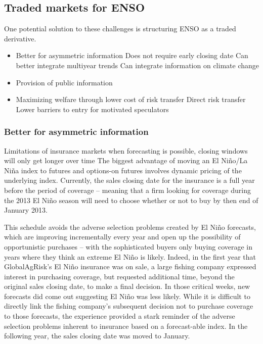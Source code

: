 \documentclass[authoryear]{article}
\begin{document}
\subsection{Traded markets for ENSO}
One potential solution to these challenges is structuring ENSO as a traded derivative.


\begin{itemize}
\item Better for asymmetric information
  \subitem Does not require early closing date
  \subitem Can better integrate multiyear trends
  \subitem Can integrate information on climate change
\item Provision of public information
\item Maximizing welfare through lower cost of risk transfer
  \subitem Direct risk transfer
  \subitem Lower barriers to entry for motivated speculators
\end{itemize}

\subsubsection{Better for asymmetric information} Limitations of insurance markets when forecasting is possible, closing windows will only get longer over time
The biggest advantage of moving an El Ni\~no/La Ni\~na index to futures and options-on futures involves dynamic pricing of the underlying index. Currently, the sales closing date for the insurance is a full year before the period of coverage – meaning that a firm looking for coverage during the 2013 El Ni\~no season will need to choose whether or not to buy by then end of January 2013. 

This schedule avoids the adverse selection problems created by El Ni\~no forecasts, which are improving incrementally every year and open up the possibility of opportunistic purchases – with the sophisticated buyers only buying coverage in years where they think an extreme El Ni\~no is likely. Indeed, in the first year that GlobalAgRisk’s El Ni\~no insurance was on sale, a large fishing company expressed interest in purchasing coverage, but requested additional time, beyond the original sales closing date, to make a final decision. In those critical weeks, new forecasts did come out suggesting El Ni\~no was less likely. While it is difficult to directly link the fishing company's subsequent decision not to purchase coverage to those forecasts, the experience provided a stark reminder of the adverse selection problems inherent to insurance based on a forecast-able index. In the following year, the sales closing date was moved to January. 
\end{document}
